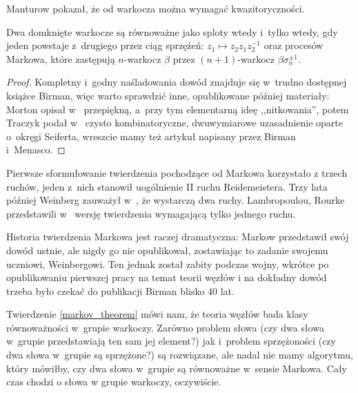 Manturow \cite{manturov02} pokazał, że od warkocza można wymagać kwazitoryczności.
%

\begin{theorem}[Markow, 1936]
%
\label{markov_theorem}
    Dwa domknięte warkocze są równoważne jako sploty wtedy i~tylko wtedy,
    gdy jeden powstaje z~drugiego przez ciąg
    sprzężeń: $z_1 \mapsto z_2 z_1 z_2^{-1}$ oraz procesów Markowa,
    które zastępują $n$-warkocz $\beta$ przez $(n+1)$-warkocz $\beta\sigma_n^{\pm 1}$.
\end{theorem}

\begin{proof}
%
%
%
%
    Kompletny i~godny naśladowania dowód znajduje się w~trudno dostępnej książce \cite{birman74} Birman, więc warto sprawdzić inne, opublikowane później materiały:
    Morton opisał w~\cite{mortonhr86} przepiękną, a~przy tym elementarną ideę ,,nitkowania'',
    potem Traczyk podał w~\cite{traczyk98} czysto kombinatoryczne, dwuwymiarowe uzasadnienie oparte o~okręgi Seiferta,
    wreszcie mamy też artykuł \cite{birman02} napisany przez Birman i~Menasco.
\end{proof}

Pierwsze sformułowanie twierdzenia pochodzące od Markowa \cite{markov36} korzystało z trzech ruchów, jeden z~nich stanowił uogólnienie II ruchu Reidemeistera.
Trzy lata później Weinberg zauważył w~\cite{weinberg39}, że wystarczą dwa ruchy.
%
Lambropoulou, Rourke przedstawili w~\cite{lambropoulou97} wersję twierdzenia wymagającą tylko jednego ruchu.
%
%

Historia twierdzenia Markowa jest raczej dramatyczna: Markow przedstawił swój dowód ustnie, ale nigdy go nie opublikował, zostawiając to zadanie swojemu uczniowi, Weinbergowi.
Ten jednak został zabity podczas wojny, wkrótce po opublikowaniu pierwszej pracy na temat teorii węzłów i na dokładny dowód trzeba było czekać do publikacji Birman \cite{birman74} blisko 40 lat.
%

Twierdzenie \ref{markov_theorem} mówi nam, że teoria węzłów bada klasy równoważności w~grupie warkoczy.
Zarówno problem słowa (czy dwa słowa w~grupie przedstawiają ten sam jej element?) jak i~problem sprzężoności (czy dwa słowa w~grupie są sprzężone?) są rozwiązane, ale nadal nie mamy algorytmu, który mówiłby, czy dwa słowa w~grupie są równoważne w~sensie Markowa.
Cały czas chodzi o słowa w grupie warkoczy, oczywiście.

